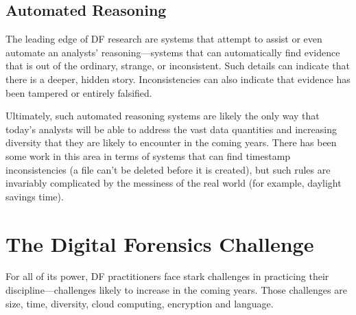 \documentclass[11pt,letter]{article}
\begin{document}
\subsection{Automated Reasoning}

The leading edge of DF research are systems that
attempt to assist or even automate an analysts' reasoning---systems
that can automatically find evidence that is out of the ordinary,
strange, or inconsistent. Such details can indicate that there is a
deeper, hidden story. Inconsistencies can also indicate that evidence has been
tampered or entirely falsified. 

Ultimately, such automated reasoning systems are likely the only way
that today's analysts will be able to address the vast data
quantities and increasing diversity that they are likely to encounter
in the coming years. There has been some work in this area in
terms of systems that can find timestamp inconsistencies (a file
can't be deleted before it is created), but such rules are invariably
complicated by the messiness of the real world (for example, daylight
savings time). 

\section{The Digital Forensics Challenge}

For all of its power, DF practitioners face stark
challenges in practicing their discipline---challenges likely to
increase in the coming years. Those challenges are size,
time, diversity, cloud computing, encryption and language.
\end{document}
